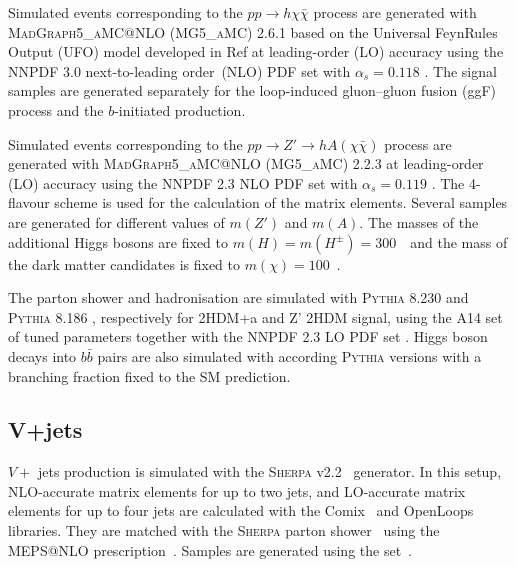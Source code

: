 \par Simulated events corresponding to the $pp\to h\chi\bar{\chi}$ process are generated with \textsc{MadGraph5\_aMC@NLO} (\textsc{MG5\_aMC}) 2.6.1 \cite{Alwall:2014hca} 
based on the Universal FeynRules Output (UFO) model developed in Ref\cite{Abe:2018bpo} at leading-order (LO) accuracy using the NNPDF 3.0 next-to-leading order~(NLO) PDF set with $\alpha_s=0.118$ \cite{Ball:2014uwa}. 
The signal samples are generated separately for the loop-induced gluon--gluon fusion (ggF) process and the $b$-initiated production. 

\par Simulated events corresponding to the $pp\to Z'\to h A(\chi\bar{\chi})$ process are generated with \textsc{MadGraph5\_aMC@NLO} (\textsc{MG5\_aMC}) 2.2.3 \cite{Alwall:2014hca} 
at leading-order (LO) accuracy using the NNPDF 2.3 NLO PDF set with $\alpha_s=0.119$ \cite{Ball:2012cx}. 
The 4-flavour scheme is used for the calculation of the matrix elements. Several samples are generated for different values of $m(Z')$ and $m(A)$.
The masses of the additional Higgs bosons are fixed to $m(H)=m(H^{\pm})=300$~\GeV~and the mass of the dark matter candidates is fixed to $m(\chi)=100$~\GeV. 

\par The parton shower and hadronisation are simulated with \textsc{Pythia} 8.230 \cite{Sjostrand:2014zea} and \textsc{Pythia} 8.186 \cite{Sjostrand:2007gs}, respectively for 2HDM+a and Z' 2HDM signal,
using the A14 set \cite{ATL-PHYS-PUB-2014-021} of tuned parameters together with the NNPDF 2.3 LO PDF set \cite{Ball:2011mu}. 
Higgs boson decays into $b\bar{b}$ pairs are also simulated with according \textsc{Pythia} versions with a branching fraction fixed to the SM prediction.

\subsection{V+jets}

\par $V+$ jets production is simulated with the \textsc{Sherpa} v2.2~\cite{Bothmann:2019yzt} generator. 
In this setup, NLO-accurate matrix elements for up to two jets, and LO-accurate matrix elements for up to four jets are calculated with the Comix~\cite{Gleisberg:2008fv} and OpenLoops~\cite{Cascioli:2011va,Denner:2016kdg} libraries. 
They are matched with the \textsc{Sherpa} parton shower~\cite{Schumann:2007mg} using the MEPS@NLO prescription~\cite{Hoeche:2011fd,Hoeche:2012yf,Catani:2001cc,Hoeche:2009rj}.
Samples are generated using the \nnpdfnnlo set~\cite{Ball:2014uwa}.

